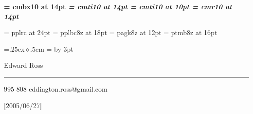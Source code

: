 \def\name{Edward Ross}
\def\addrone{}
\def\addrtwo{}
\def\phone{0403 995 808}
\def\email{eddington.ross@gmail.com}

\font\bf = cmbx10 at 14pt
\font\it = cmti10 at 14pt
\font\smallit = cmti10 at 10pt
\font\rm = cmr10 at 14pt

\def\nameReference#1{{\it #1}}

\font\titleFont = pplrc at 24pt
\font\headFont = pplbc8z at 18pt
\font\infoFont = pagk8z at 12pt
\font\sectionFont = ptmb8z at 16pt


\parskip=0pt
\parindent=0pt

\def\head#1{\vskip2pt\hfil\headFont #1\hfill\vskip3pt}

\def\startSkill{\relax}
\def\skill#1{\rm {\vskip10pt {\sectionFont #1}}\vskip6pt}
\def\endSkill{\relax}

\def\bullet{\leavevmode\raise .25ex\hbox{$\diamond$}\kern.5em}
\newdimen\bulletSize
{}=\hbox{\bullet}
\bulletSize=
\advance\bulletSize by 3pt 
\def\startExp#1#2#3{\rm{\sectionFont #1} \hfill {\it #2}\par\nobreak\vskip1pt\nobreak #3\par\nobreak\vskip2.5pt\nobreak\leftskip=0mm\parskip=1pt}
\def\exp#1{\hangindent=\bulletSize\hangafter=1%
\bullet #1 \par}
\def\endExp{\leftskip=0mm\parskip=0mm\vskip10pt}

\def\description#1{{\rm #1}}


\def\skilljump{\vskip2mm}


\def\pageHead{\hfil {\titleFont\name} \hfil
\vskip 3pt
\hrule 
\vskip 5pt
{\infoFont\phone} \hfill {\infoFont\markupEmail{\email}}\par
\vskip 2pt}


\ifx\pdfoutput\undefined
\def\markupEmail#1{#1}
\pageHead
\else
 
\beginpackages
  \usepackage{url}[2005/06/27]
  \usepackage{color}
\endpackages
\enablehyperlinks
{}

